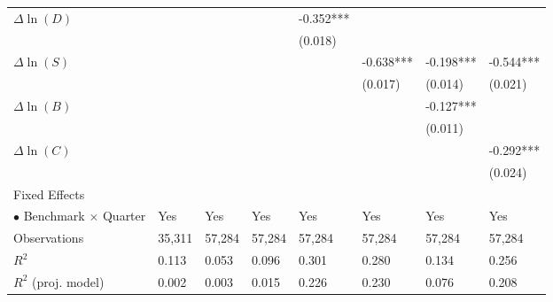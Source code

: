\documentclass[openany]{book}
\theoremstyle{definition}
\theoremstyle{definition}
\theoremstyle{definition}
\theoremstyle{remark}
\begin{document}
\begin{table}[ht]
\begin{tabularx}{0.975\textwidth}{lYYYYYYY}
  $\Delta\ln(D)$ &  &  &  & -0.352*** &  &  &  \\ 
   &  &  &  & (0.018) &  &  &  \\ 
  $\Delta\ln(S)$ &  &  &  &  & -0.638*** & -0.198*** & -0.544*** \\ 
   &  &  &  &  & (0.017) & (0.014) & (0.021) \\ 
  $\Delta\ln(B)$ &  &  &  &  &  & -0.127*** &  \\ 
   &  &  &  &  &  & (0.011) &  \\ 
  $\Delta\ln(C)$ &  &  &  &  &  &  & -0.292*** \\ 
   &  &  &  &  &  &  & (0.024) \\ 
  Fixed Effects &  &  &  &  &  &  &  \\ 
  $\bullet$ Benchmark $\times$ Quarter & Yes & Yes & Yes & Yes & Yes & Yes & Yes \\ 
  Observations & 35,311 & 57,284 & 57,284 & 57,284 & 57,284 & 57,284 & 57,284 \\ 
  $R^2$ & 0.113 & 0.053 & 0.096 & 0.301 & 0.280 & 0.134 & 0.256 \\ 
  $R^2$ (proj. model) & 0.002 & 0.003 & 0.015 & 0.226 & 0.230 & 0.076 & 0.208 \\ 
   \bottomrule
\end{tabularx}
\endgroup
\end{table}
\end{document}
